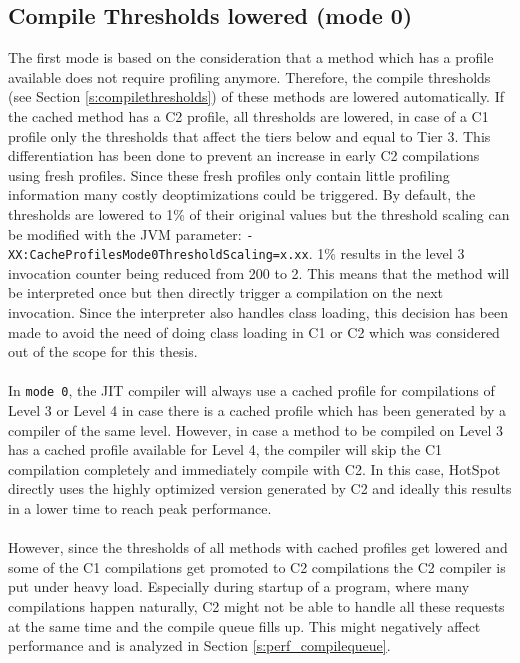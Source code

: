 \subsection{Compile Thresholds lowered (mode 0)}
\label{s:mode0}
The first mode is based on the consideration that a method which has a profile available does not require profiling anymore. Therefore, the compile thresholds (see Section \ref{s:compilethresholds}) of these methods are lowered automatically. If the cached method has a C2 profile, all thresholds are lowered, in case of a C1 profile only the thresholds that affect the tiers below and equal to Tier 3. This differentiation has been done to prevent an increase in early C2 compilations using fresh profiles. Since these fresh profiles only contain little profiling information many costly deoptimizations could be triggered. By default, the thresholds are lowered to 1\% of their original values but the threshold scaling can be modified with the JVM parameter: \texttt{-XX:CacheProfilesMode0ThresholdScaling=x.xx}. 1\% results in the level 3 invocation counter being reduced from 200 to 2. This means that the method will be interpreted once but then directly trigger a compilation on the next invocation.
Since the interpreter also handles class loading, this decision has been made to avoid the need of doing class loading in C1 or C2 which was considered out of the scope for this thesis.
\\\\
In \texttt{mode 0}, the JIT compiler will always use a cached profile for compilations of Level 3 or Level 4 in case there is a cached profile which has been generated by a compiler of the same level. However, in case a method to be compiled on Level 3 has a cached profile available for Level 4, the compiler will skip the C1 compilation completely and immediately compile with C2. In this case, HotSpot directly uses the highly optimized version generated by C2 and ideally this results in a lower time to reach peak performance.
\\\\
However, since the thresholds of all methods with cached profiles get lowered and some of the C1 compilations get promoted to C2 compilations the C2 compiler is put under heavy load. Especially during startup of a program, where many compilations happen naturally, C2 might not be able to handle all these requests at the same time and the compile queue fills up. This might negatively affect performance and is analyzed in Section \ref{s:perf_compilequeue}.

